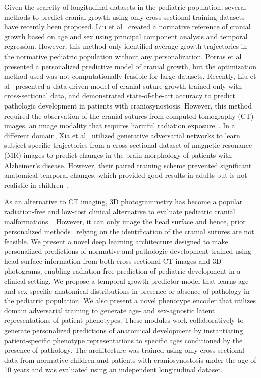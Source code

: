 \documentclass[conference]{IEEEtran}
\begin{document}
Given the scarcity of longitudinal datasets in the pediatric population, several methods to predict cranial growth using only cross-sectional training datasets have recently been proposed. Liu et al~\cite{Liu2022Data-driven} created a normative reference of cranial growth based on age and sex using principal component analysis and temporal regression. However, this method only identified average growth trajectories in the normative pediatric population without any personalization. Porras et al~\cite{Porras2022Predictive} presented a personalized predictive model of cranial growth, but the optimization method used was not computationally feasible for large datasets. Recently, Liu et al~\cite{Liu2023Data-driven} presented a data-driven model of cranial suture growth trained only with cross-sectional data, and demonstrated state-of-the-art accuracy to predict pathologic development in patients with craniosynostosis. However, this method required the observation of the cranial sutures from computed tomography (CT) images, an image modality that requires harmful radiation exposure~\cite{Schweitzer2012Avoiding}. In a different domain, Xia et al~\cite{Xia2021Learning} utilized generative adversarial networks to learn subject-specific trajectories from a cross-sectional dataset of magnetic resonance (MR) images to predict changes in the brain morphology of patients with Alzheimer’s disease. However, their paired training scheme prevented significant anatomical temporal changes, which provided good results in adults but is not realistic in children~\cite{Hasegawa2018Developmental}.

As an alternative to CT imaging, 3D photogrammetry has become a popular radiation-free and low-cost clinical alternative to evaluate pediatric cranial malformations~\cite{Porras2019Quantification, Abdel-Alim2021Three-Dimensional}. However, it can only image the head surface and hence, prior personalized  methods~\cite{Liu2023Data-driven} relying on the identification of the cranial sutures are not feasible. We present a novel deep learning architecture designed to make personalized predictions of normative and pathologic development trained using head surface information from both cross-sectional CT images and 3D photograms, enabling radiation-free prediction of pediatric development in a clinical setting. We propose a temporal growth predictor model that learns age- and sex-specific anatomical distributions in presence or absence of pathology in the pediatric population. We also present a novel phenotype encoder that utilizes domain adversarial training to generate age- and sex-agnostic latent representations of patient phenotypes. These modules work collaboratively to generate personalized predictions of anatomical development by instantiating patient-specific phenotype representations to specific ages conditioned by the presence of pathology. The architecture was trained using only cross-sectional data from normative children and patients with craniosynostosis under the age of 10 years and was evaluated using an independent longitudinal dataset.
\end{document}
